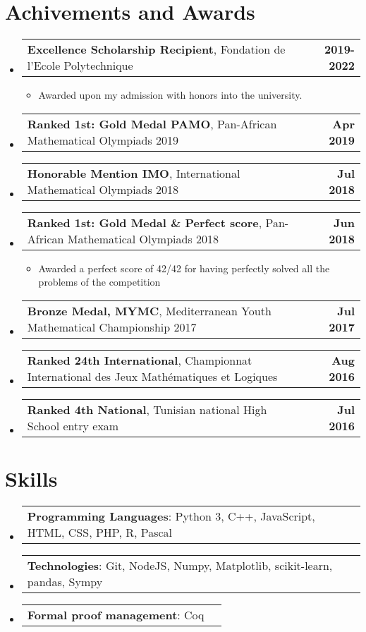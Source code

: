 \documentclass[letterpaper,11pt]{article}
\makeatletter
\newcommand{\resumeItem}[2]{
  \item\small{
    \textbf{#1}{#2 \vspace{-2pt}}
  }
}
\newcommand{\resumePoint}[2]{
  \item
    \begin{tabular*}{0.97\textwidth}[t]{l@{\extracolsep{\fill}}r}
      #1 & \textbf{\small #2}
    \end{tabular*}
}
\newcommand{\resumeSubHeadingListStart}{\begin{itemize}[leftmargin=*]}
\newcommand{\resumeSubHeadingListEnd}{\end{itemize}}
\newcommand{\resumeItemListStart}{\begin{itemize}}
\newcommand{\resumeItemListEnd}{\end{itemize}\vspace{-5pt}}
\makeatother
\begin{document}
\section{Achivements and Awards}
  \resumeSubHeadingListStart
    \resumePoint
      {\textbf{Excellence Scholarship Recipient}, Fondation de l'Ecole Polytechnique}{2019-2022}
      \vspace{-0.6cm}\resumeItemListStart
        \resumeItem{}{Awarded upon my admission with honors into the university.}
      \resumeItemListEnd
    \resumePoint
      {\textbf{Ranked 1st: Gold Medal PAMO}, Pan-African Mathematical Olympiads 2019}{Apr 2019}
      \vspace{-0.6cm}\resumeItemListStart
      \resumeItemListEnd
   \resumePoint
      {\textbf{Honorable Mention IMO}, International Mathematical Olympiads 2018}{Jul 2018}
      \vspace{-0.6cm}\resumeItemListStart
      \resumeItemListEnd
    \resumePoint
      {\textbf{Ranked 1st: Gold Medal \& Perfect score}, Pan-African Mathematical Olympiads 2018}{Jun 2018}
      \vspace{-0.6cm}\resumeItemListStart
        \resumeItem{}{Awarded a perfect score of 42/42 for having perfectly solved all the problems of the competition}
      \resumeItemListEnd
    \resumePoint
      {\textbf{Bronze Medal, MYMC}, Mediterranean Youth Mathematical Championship 2017}{Jul 2017}
      \vspace{-0.6cm}\resumeItemListStart
      \resumeItemListEnd
    \resumePoint
      {\textbf{Ranked 24th International}, Championnat International des Jeux Mathématiques et Logiques}{Aug 2016}
      \vspace{-0.6cm}\resumeItemListStart
      \resumeItemListEnd
    \resumePoint
      {\textbf{Ranked 4th National}, Tunisian national High School entry exam}{Jul 2016}
      \vspace{-0.6cm}\resumeItemListStart
      \resumeItemListEnd

  \resumeSubHeadingListEnd

 \section{Skills}
  \resumeSubHeadingListStart
    \resumePoint
     {\textbf{Programming Languages}: Python 3, C++, JavaScript, HTML, CSS, PHP, R, Pascal}{}
   \vspace*{-0.7cm}
    \resumePoint
     {\textbf{Technologies}: Git, NodeJS, Numpy, Matplotlib, scikit-learn, pandas, Sympy}{}
    \vspace*{-0.7cm}
    \resumePoint
     {\textbf{Formal proof management}: Coq}{}
  \resumeSubHeadingListEnd
\end{document}
